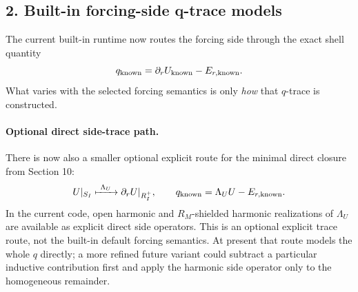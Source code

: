 \documentclass[11pt,a4paper]{article}
\begin{document}
\subsection*{2. Built-in forcing-side q-trace models}

The current built-in  runtime now routes the forcing side
through the exact shell quantity
\[
q_{\rm known} = \partial_r U_{\rm known} - E_{r,\rm known}.
\]
What varies with the selected forcing semantics is only \emph{how} that
\(q\)-trace is constructed.

\paragraph{Optional direct side-trace path.}
There is now also a smaller optional explicit route for the minimal direct
closure from Section 10:
\[
U|_{S_I}
\xmapsto{\ \Lambda_U\ }
\partial_r U|_{R_I^+},
\qquad
q_{\rm known}=\Lambda_U U-E_{r,\rm known}.
\]
In the current code, open harmonic and \(R_M\)-shielded harmonic realizations
of \(\Lambda_U\) are available as explicit direct side operators. This is an
optional explicit trace route, not the built-in default forcing semantics.
At present that route models the whole \(q\) directly; a more refined future
variant could subtract a particular inductive contribution first and apply the
harmonic side operator only to the homogeneous remainder.
\end{document}
